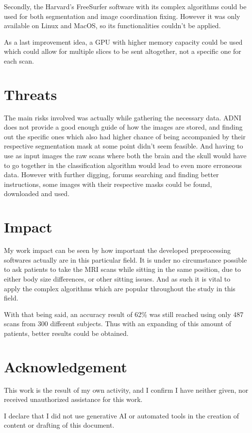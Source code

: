 \documentclass[a4paper]{article} %
\begin{document}
Secondly, the Harvard's FreeSurfer software with its complex algorithms could be used for both segmentation and image coordination fixing. However it was only
available on Linux and MacOS, so its functionalities couldn't be applied.

As a last improvement idea, a GPU with higher memory capacity could be used which could allow for multiple slices to be sent altogether, not a specific one for each
scan.

\section{Threats}
The main risks involved was actually while gathering the necessary data. ADNI does not provide a good enough guide of how the images are stored, and finding
out the specific ones which also had higher chance of being accompanied by their respective segmentation mask at some point didn't seem feasible. And having
to use as input images the raw scans where both the brain and the skull would have to go together in the classification algorithm would lead to even more
erroneous data. However with further digging, forums searching and finding better instructions, some images with their respective masks could be found,
downloaded and used.

\section{Impact}
My work impact can be seen by how important the developed preprocessing softwares actually are in this particular field. It is under no circumstance
possible to ask patients to take the MRI scans while sitting in the same position, due to either body size differences, or other sitting issues.
And as such it is vital to apply the complex algorithms which are popular throughout the study in this field.

With that being said, an accuracy result of 62\% was still reached using only 487 scans from 300 different subjects. Thus with an expanding of this
amount of patients, better results could be obtained.

\section{Acknowledgement}

This work is the result of my own activity, and I confirm I have neither given, nor received unauthorized assistance for this work.

I declare that I did not use generative AI or automated tools in the creation of content or drafting of this document.
\end{document}
